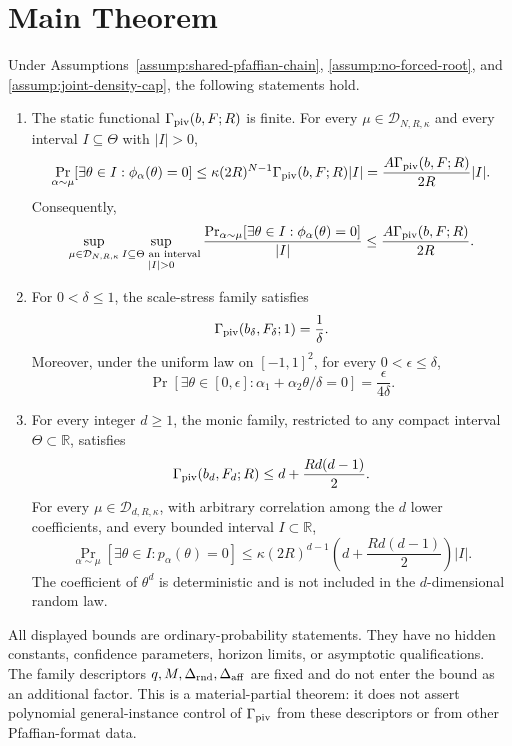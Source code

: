 \section{Main Theorem}\label{sec:main-theorem}

\begin{theorem}
\label{thm:main}
Under Assumptions~\ref{assump:shared-pfaffian-chain},
\ref{assump:no-forced-root}, and \ref{assump:joint-density-cap}, the following
statements hold.

\begin{enumerate}[label=\textnormal{(\roman*)}]
\item The static functional $\Gamma_{\rm piv}(b,F;R)$ is finite.  For every
$\mu\in\mathcal D_{N,R,\kappa}$ and every interval $I\subseteq\Theta$ with
$|I|>0$,
\[
\Pr_{\alpha\sim\mu}\!\left[
  \exists\theta\in I:\phi_\alpha(\theta)=0
\right]
\leq
\kappa(2R)^{N-1}\Gamma_{\rm piv}(b,F;R)|I|
=\frac{A\Gamma_{\rm piv}(b,F;R)}{2R}|I|.
\]
Consequently,
\[
\sup_{\mu\in\mathcal D_{N,R,\kappa}}
\sup_{\substack{I\subseteq\Theta\text{ an interval}\\|I|>0}}
\frac{\Pr_{\alpha\sim\mu}[
  \exists\theta\in I:\phi_\alpha(\theta)=0]}{|I|}
\leq\frac{A\Gamma_{\rm piv}(b,F;R)}{2R}.
\]

\item For $0<\delta\leq1$, the scale-stress family satisfies
\[
\Gamma_{\rm piv}(b_\delta,F_\delta;1)=\frac1\delta.
\]
Moreover, under the uniform law on $[-1,1]^2$, for every
$0<\epsilon\leq\delta$,
\[
\Pr\!\left[
  \exists\theta\in[0,\epsilon]:
  \alpha_1+\alpha_2\theta/\delta=0
\right]
=\frac{\epsilon}{4\delta}.
\]

\item For every integer $d\geq1$, the monic family, restricted to any
compact interval $\Theta\subset\mathbb R$, satisfies
\[
\Gamma_{\rm piv}(b_d,F_d;R)
\leq d+\frac{Rd(d-1)}2.
\]
For every $\mu\in\mathcal D_{d,R,\kappa}$, with arbitrary correlation among
the $d$ lower coefficients, and every bounded interval
$I\subset\mathbb R$,
\[
\Pr_{\alpha\sim\mu}\!\left[
  \exists\theta\in I:p_\alpha(\theta)=0
\right]
\leq
\kappa(2R)^{d-1}
\left(d+\frac{Rd(d-1)}2\right)|I|.
\]
The coefficient of $\theta^d$ is deterministic and is not included in the
$d$-dimensional random law.
\end{enumerate}

All displayed bounds are ordinary-probability statements.  They have no
hidden constants, confidence parameters, horizon limits, or asymptotic
qualifications.  The family descriptors
$q,M,\Delta_{\rm rnd},\Delta_{\rm aff}$ are fixed and do not enter the
bound as an additional factor.  This is a material-partial theorem: it does
not assert polynomial general-instance control of $\Gamma_{\rm piv}$ from
these descriptors or from other Pfaffian-format data.
\end{theorem}
